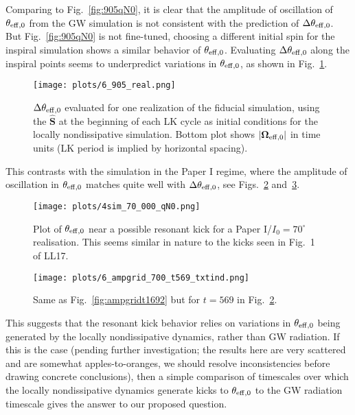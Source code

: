 \documentclass[11pt,
        usenames, %
        dvipsnames %
    ]{article}
\newcommand*{\bm}[1]{\boldsymbol{\mathbf{#1}}}
\newcommand*{\uv}[1]{\hat{\bm{#1}}}
\newcommand*{\abs}[1]{\left|#1\right|}
\begin{document}
Comparing to Fig.~\ref{fig:905qN0}, it is clear that the amplitude of
oscillation of $\theta_{\rm eff, 0}$ from the GW simulation is not consistent
with the prediction of $\Delta \theta_{\rm eff, 0}$. But Fig.~\ref{fig:905qN0}
is not fine-tuned, choosing a different initial spin for the inspiral simulation
shows a similar behavior of $\theta_{\rm eff, 0}$. Evaluating $\Delta
\theta_{\rm eff, 0}$ along the inspiral points seems to underpredict variations
in $\theta_{\rm eff, 0}$, as shown in Fig.~\ref{fig:6_905real}.
\begin{figure}
    \centering
    \texttt{[image: plots/6\_905\_real.png]}
    \caption{$\Delta \theta_{\rm eff, 0}$ evaluated for one realization of the
    fiducial simulation, using the $\uv{S}$ at the beginning of each LK cycle as
    initial conditions for the locally nondissipative
    simulation. Bottom plot shows $\abs{\bm{\Omega}_{\rm eff, 0}}$ in time
    units (LK period is implied by horizontal spacing).}\label{fig:6_905real}
\end{figure}

This contrasts with the simulation in the Paper I regime, where the amplitude of
oscillation in $\theta_{\rm eff, 0}$ matches quite well with $\Delta \theta_{\rm
eff, 0}$, see Figs.~\ref{fig:4_70_qN0} and~\ref{fig:ampgrid_569}.
\begin{figure}
    \centering
    \texttt{[image: plots/4sim\_70\_000\_qN0.png]}
    \caption{Plot of $\theta_{\rm eff, 0}$ near a possible resonant kick for a
    Paper I/$I_0 = 70^\circ$ realisation. This seems similar in nature to the
    kicks seen in Fig.~1 of LL17.}\label{fig:4_70_qN0}
\end{figure}
\begin{figure}
    \centering
    \texttt{[image: plots/6\_ampgrid\_700\_t569\_txtind.png]}
    \caption{Same as Fig.~\ref{fig:ampgridt1692} but for $t = 569$ in
    Fig.~\ref{fig:4_70_qN0}.}\label{fig:ampgrid_569}
\end{figure}

This suggests that the resonant kick behavior relies on variations in
$\theta_{\rm eff, 0}$ being generated by the locally nondissipative dynamics,
rather than GW radiation. If this is the case (pending further investigation;
the results here are very scattered and are somewhat apples-to-oranges, we
should resolve inconsistencies before drawing concrete conclusions), then a
simple comparison of timescales over which the locally nondissipative dynamics
generate kicks to $\theta_{\rm eff, 0}$ to the GW radiation timescale gives the
answer to our proposed question.
\end{document}
